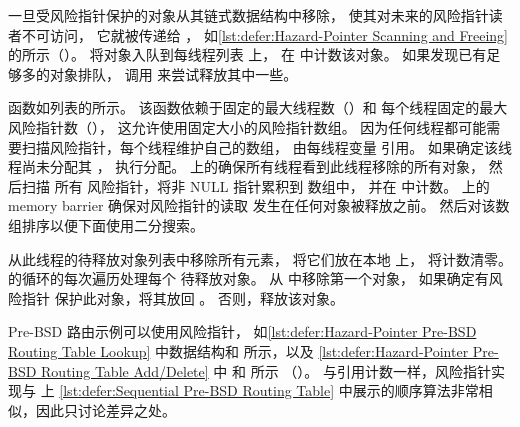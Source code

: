 \begin{listing}
\caption{风险指针扫描和释放}
\label{lst:defer:Hazard-Pointer Scanning and Freeing}
\end{listing}

\begin{fcvref}
一旦受风险指针保护的对象从其链式数据结构中移除，
使其对未来的风险指针读者不可访问，
它就被传递给 ，
如\cref{lst:defer:Hazard-Pointer Scanning and Freeing}
的所示（）。
将对象入队到每线程列表  上，
在  中计数该对象。
如果发现已有足够多的对象排队，
调用  来尝试释放其中一些。
\end{fcvref}

\begin{fcvref}
 函数如列表的所示。
该函数依赖于固定的最大线程数（）和
每个线程固定的最大风险指针数（），
这允许使用固定大小的风险指针数组。
因为任何线程都可能需要扫描风险指针，每个线程维护自己的数组，
由每线程变量  引用。
如果确定该线程尚未分配其 ，
执行分配。
上的确保所有线程看到此线程移除的所有对象，
然后扫描
所有 风险指针，将非 NULL 指针累积到  数组中，
并在  中计数。
上的 memory barrier 确保对风险指针的读取
发生在任何对象被释放之前。
然后对该数组排序以便下面使用二分搜索。

从此线程的待释放对象列表中移除所有元素，
将它们放在本地  上，
将计数清零。
的循环的每次遍历处理每个
待释放对象。
从  中移除第一个对象，
如果确定有风险指针
保护此对象，将其放回 。
否则，释放该对象。
\end{fcvref}

\begin{listing}

\caption{风险指针 Pre-BSD 路由表查找}
\label{lst:defer:Hazard-Pointer Pre-BSD Routing Table Lookup}
\end{listing}

Pre-BSD 路由示例可以使用风险指针，
如\cref{lst:defer:Hazard-Pointer Pre-BSD Routing Table Lookup}
中数据结构和  所示，以及
\cref{lst:defer:Hazard-Pointer Pre-BSD Routing Table Add/Delete}
中  和  所示
（）。
与引用计数一样，风险指针实现与
上
\cref{lst:defer:Sequential Pre-BSD Routing Table}
中展示的顺序算法非常相似，因此只讨论差异之处。

